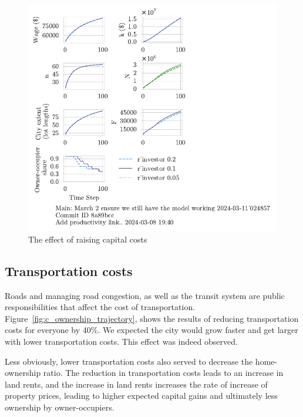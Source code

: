\begin{figure}[h!t]
    \centering
    \includegraphics[scale=1., trim={0 1.4cm 0 0},clip]{fig/r_investor-Main-024857.pdf}
    \caption{The effect of raising capital costs}
    \label{fig:capital_ownership_trajectory}
\end{figure}

\newpage
\subsection{Transportation costs}
Roads and managing road congestion, as well as the transit system are public responsibilities that affect the cost of transportation. %
Figure~\ref{fig:c_ownership_trajectory}, shows the results of reducing transportation costs for everyone by 40\%. 
We expected the city would grow faster and get larger with lower transportation costs. This effect was indeed observed. 

Less obviously, lower transportation costs also served to decrease the home-ownership ratio. The reduction in transportation costs leads to an increase in land rents, and the increase in land rents increases the rate of increase of property prices, leading to higher expected capital gains and ultimately less ownership by owner-occupiers. 

